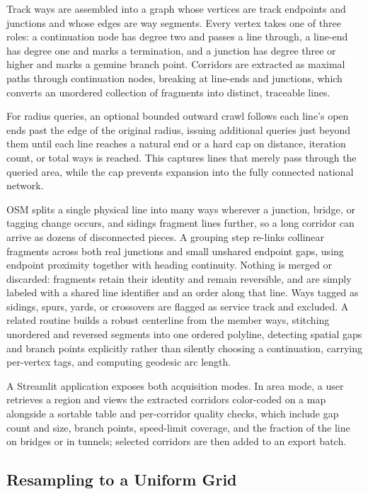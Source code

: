 \documentclass[numbered]{trbunofficial}
\begin{document}
Track ways are assembled into a graph whose vertices are track endpoints and junctions and whose edges are way segments. Every vertex takes one of three roles: a continuation node has degree two and passes a line through, a line-end has degree one and marks a termination, and a junction has degree three or higher and marks a genuine branch point. Corridors are extracted as maximal paths through continuation nodes, breaking at line-ends and junctions, which converts an unordered collection of fragments into distinct, traceable lines.

For radius queries, an optional bounded outward crawl follows each line's open ends past the edge of the original radius, issuing additional queries just beyond them until each line reaches a natural end or a hard cap on distance, iteration count, or total ways is reached. This captures lines that merely pass through the queried area, while the cap prevents expansion into the fully connected national network.

OSM splits a single physical line into many ways wherever a junction, bridge, or tagging change occurs, and sidings fragment lines further, so a long corridor can arrive as dozens of disconnected pieces. A grouping step re-links collinear fragments across both real junctions and small unshared endpoint gaps, using endpoint proximity together with heading continuity. Nothing is merged or discarded: fragments retain their identity and remain reversible, and are simply labeled with a shared line identifier and an order along that line. Ways tagged as sidings, spurs, yards, or crossovers are flagged as service track and excluded. A related routine builds a robust centerline from the member ways, stitching unordered and reversed segments into one ordered polyline, detecting spatial gaps and branch points explicitly rather than silently choosing a continuation, carrying per-vertex tags, and computing geodesic arc length.

A Streamlit application exposes both acquisition modes. In area mode, a user retrieves a region and views the extracted corridors color-coded on a map alongside a sortable table and per-corridor quality checks, which include gap count and size, branch points, speed-limit coverage, and the fraction of the line on bridges or in tunnels; selected corridors are then added to an export batch.

\subsection{Resampling to a Uniform Grid}
\end{document}
